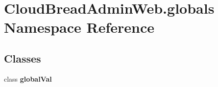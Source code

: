 \hypertarget{a00421}{}\section{Cloud\+Bread\+Admin\+Web.\+globals Namespace Reference}
\label{a00421}
\subsection*{Classes}
\begin{DoxyCompactItemize}
\item 
class {\bfseries global\+Val}
\end{DoxyCompactItemize}
